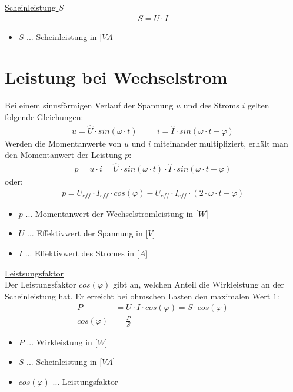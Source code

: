 \underline{Scheinleistung $S$}
\begin{align}
    S = U \cdot I
\end{align}
\begin{itemize}
    \item $S$ ... Scheinleistung in [$VA$]
\end{itemize}

\newpage

\section{Leistung bei Wechselstrom}
Bei einem sinusförmigen Verlauf der Spannung $u$ und des Stroms $i$ gelten folgende Gleichungen:
\begin{align}
    u = \hat{U} \cdot sin(\omega \cdot t) \hspace{1cm} i = \hat{I} \cdot sin(\omega \cdot t - \varphi)
\end{align}
Werden die Momentanwerte von $u$ und $i$ miteinander multipliziert, erhält man den Momentanwert der Leistung $p$:
\begin{align}
    p = u \cdot i = \hat{U} \cdot sin(\omega \cdot t) \cdot \hat{I} \cdot sin(\omega \cdot t - \varphi)
\end{align}
oder:
\begin{align}
    p = U_{eff} \cdot I_{eff} \cdot cos(\varphi) - U_{eff} \cdot I_{eff} \cdot (2\cdot \omega \cdot t - \varphi)
\end{align}

\begin{itemize}
    \item $p$ ... Momentanwert der Wechselstromleistung in [$W$]
    \item $U$ ... Effektivwert der Spannung in [$V$]
    \item $I$ ... Effektivwert des Stromes in [$A$]
\end{itemize}

\underline{Leistsungsfaktor} \\
Der Leistungsfaktor $cos(\varphi)$ gibt an, welchen Anteil die Wirkleistung an der Scheinleistung hat. Er erreicht bei ohmschen Lasten den maximalen Wert $1$:
\begin{align}
    P &= U \cdot I \cdot cos(\varphi) = S \cdot cos(\varphi) \\
    cos(\varphi) &= \frac{P}{S} 
\end{align}
\begin{itemize}
    \item $P$ ... Wirkleistung in [$W$]
    \item $S$ ... Scheinleistung in [$VA$]
    \item $cos(\varphi)$ ... Leistungsfaktor
\end{itemize}

